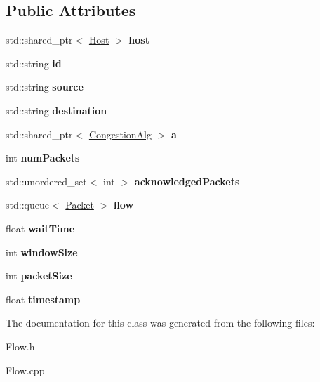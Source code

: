 \subsection*{\-Public \-Attributes}
\begin{DoxyCompactItemize}
\item 
\hypertarget{classFlow_af45cdc7b3609577eb08cb072e9631809}{std\-::shared\-\_\-ptr$<$ \hyperlink{classHost}{\-Host} $>$ {\bfseries host}}\label{classFlow_af45cdc7b3609577eb08cb072e9631809}

\item 
\hypertarget{classFlow_a8724a8f4ce94cf7bfb0db79e688ed179}{std\-::string {\bfseries id}}\label{classFlow_a8724a8f4ce94cf7bfb0db79e688ed179}

\item 
\hypertarget{classFlow_a36eb3e23b0804647c30be41835b790b3}{std\-::string {\bfseries source}}\label{classFlow_a36eb3e23b0804647c30be41835b790b3}

\item 
\hypertarget{classFlow_a536685c38def6cf8b61d0fb0d7e8372d}{std\-::string {\bfseries destination}}\label{classFlow_a536685c38def6cf8b61d0fb0d7e8372d}

\item 
\hypertarget{classFlow_aaed7f19c7331e59bb123da68239807bc}{std\-::shared\-\_\-ptr$<$ \hyperlink{classCongestionAlg}{\-Congestion\-Alg} $>$ {\bfseries a}}\label{classFlow_aaed7f19c7331e59bb123da68239807bc}

\item 
\hypertarget{classFlow_a78d725176506b21ce2355b3742ab8c17}{int {\bfseries num\-Packets}}\label{classFlow_a78d725176506b21ce2355b3742ab8c17}

\item 
\hypertarget{classFlow_a8c9d7d593004b45b1a1a88932598e9ec}{std\-::unordered\-\_\-set$<$ int $>$ {\bfseries acknowledged\-Packets}}\label{classFlow_a8c9d7d593004b45b1a1a88932598e9ec}

\item 
\hypertarget{classFlow_ae211f68d0d38e1625b06138aa71ff30c}{std\-::queue$<$ \hyperlink{classPacket}{\-Packet} $>$ {\bfseries flow}}\label{classFlow_ae211f68d0d38e1625b06138aa71ff30c}

\item 
\hypertarget{classFlow_a6b1bc90a9171baefb34683ce49ab4db6}{float {\bfseries wait\-Time}}\label{classFlow_a6b1bc90a9171baefb34683ce49ab4db6}

\item 
\hypertarget{classFlow_ab567b4507276eeb779a109c459545988}{int {\bfseries window\-Size}}\label{classFlow_ab567b4507276eeb779a109c459545988}

\item 
\hypertarget{classFlow_ac5af37a8637ec606977ebc1e33a0c59b}{int {\bfseries packet\-Size}}\label{classFlow_ac5af37a8637ec606977ebc1e33a0c59b}

\item 
\hypertarget{classFlow_ac46a1249858fde4c562938948bfb13aa}{float {\bfseries timestamp}}\label{classFlow_ac46a1249858fde4c562938948bfb13aa}

\end{DoxyCompactItemize}


\-The documentation for this class was generated from the following files\-:\begin{DoxyCompactItemize}
\item 
\-Flow.\-h\item 
\-Flow.\-cpp\end{DoxyCompactItemize}
